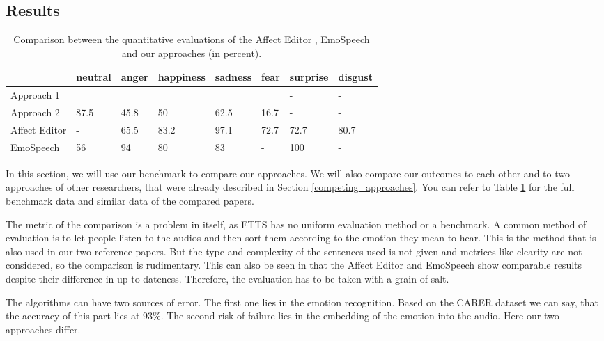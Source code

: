 \documentclass[11pt]{article}
\begin{document}
\subsection{Results}
\begin{table}[t]

\centering
\vspace{5px}
{
\begin{tabular}{|p{2cm}|p{1.5cm}|p{1.5cm}|p{1.5cm}|p{1.5cm}|p{1.5cm}|p{1.5cm}|p{1.5cm}|}
\hline
\rowcolor{mintgreen}&neutral&anger&happiness&sadness&fear&surprise&disgust\\
\hline
\cellcolor{gainsboro}Approach 1&&&&&&-&-\\
\hline
\cellcolor{gainsboro}Approach 2&87.5&45.8&50&62.5&16.7&-&-\\
\hline
\hline
\cellcolor{gainsboro}Affect Editor& -&65.5&83.2&97.1&72.7&72.7&80.7\\
\hline
\cellcolor{gainsboro}EmoSpeech&56 &94&80 &83&-&100&-\\
\hline
\end{tabular}
}

\caption{Comparison between the quantitative evaluations of the Affect Editor \cite{cahn_generation_2000}, EmoSpeech \cite{diatlova_emospeech_2023} and our approaches (in percent).}
\label{Tabelle}
\end{table}
In this section, we will use our benchmark to compare our approaches. We will also compare our outcomes to each other and to two approaches of other researchers, that were already described in Section \ref{competing_approaches}. You can refer to Table \ref{Tabelle} for the full benchmark data and similar data of the compared papers.

The metric of the comparison is a problem in itself, as ETTS has no uniform evaluation method or a benchmark. A common method of evaluation is to let people listen to the audios and then sort them according to the emotion they mean to hear. This is the method that is also used in our two reference papers. But the type and complexity of the sentences used is not given and metrices like clearity are not considered, so the comparison is rudimentary. This can also be seen in that the Affect Editor \cite{cahn_generation_2000} and EmoSpeech \cite{diatlova_emospeech_2023} show comparable results despite their difference in up-to-dateness. Therefore, the evaluation has to be taken with a grain of salt.

The algorithms can have two sources of error. The first one lies in the emotion recognition. Based on the CARER dataset \cite{saravia-etal-2018-carer} we can say, that the accuracy of this part lies at 93\%. The second risk of failure lies in the embedding of the emotion into the audio. Here our two approaches differ.
\end{document}
